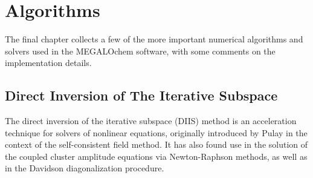 \chapter{Algorithms}

The final chapter collects a few of the more important numerical algorithms and solvers used in the MEGALOchem software, with some comments on the implementation details.

\section{Direct Inversion of The Iterative Subspace \label{sec:DIIS}}

The direct inversion of the iterative subspace (DIIS) method is an acceleration technique for solvers of nonlinear equations, originally introduced by Pulay \cite{Pul1980} in the context of the self-consistent field method. It has also found use in the solution of  the coupled cluster amplitude equations via Newton-Raphson methods, as well as in the Davidson diagonalization procedure. 

